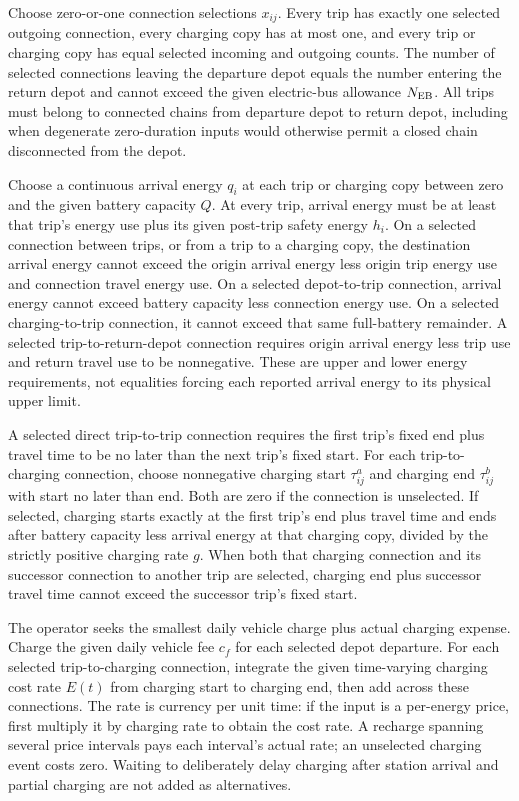 \documentclass[10pt]{article}
\begin{document}
Choose zero-or-one connection selections $x_{ij}$. Every trip has exactly one selected outgoing connection, every charging copy has at most one, and every trip or charging copy has equal selected incoming and outgoing counts. The number of selected connections leaving the departure depot equals the number entering the return depot and cannot exceed the given electric-bus allowance $N_{\rm EB}$. All trips must belong to connected chains from departure depot to return depot, including when degenerate zero-duration inputs would otherwise permit a closed chain disconnected from the depot.

Choose a continuous arrival energy $q_i$ at each trip or charging copy between zero and the given battery capacity $Q$. At every trip, arrival energy must be at least that trip's energy use plus its given post-trip safety energy $h_i$. On a selected connection between trips, or from a trip to a charging copy, the destination arrival energy cannot exceed the origin arrival energy less origin trip energy use and connection travel energy use. On a selected depot-to-trip connection, arrival energy cannot exceed battery capacity less connection energy use. On a selected charging-to-trip connection, it cannot exceed that same full-battery remainder. A selected trip-to-return-depot connection requires origin arrival energy less trip use and return travel use to be nonnegative. These are upper and lower energy requirements, not equalities forcing each reported arrival energy to its physical upper limit.

A selected direct trip-to-trip connection requires the first trip's fixed end plus travel time to be no later than the next trip's fixed start. For each trip-to-charging connection, choose nonnegative charging start $\tau^a_{ij}$ and charging end $\tau^b_{ij}$ with start no later than end. Both are zero if the connection is unselected. If selected, charging starts exactly at the first trip's end plus travel time and ends after battery capacity less arrival energy at that charging copy, divided by the strictly positive charging rate $g$. When both that charging connection and its successor connection to another trip are selected, charging end plus successor travel time cannot exceed the successor trip's fixed start.

The operator seeks the smallest daily vehicle charge plus actual charging expense. Charge the given daily vehicle fee $c_f$ for each selected depot departure. For each selected trip-to-charging connection, integrate the given time-varying charging cost rate $E(t)$ from charging start to charging end, then add across these connections. The rate is currency per unit time: if the input is a per-energy price, first multiply it by charging rate to obtain the cost rate. A recharge spanning several price intervals pays each interval's actual rate; an unselected charging event costs zero. Waiting to deliberately delay charging after station arrival and partial charging are not added as alternatives.
\end{document}
